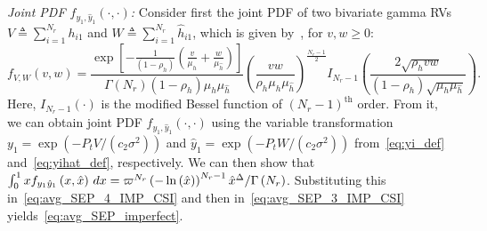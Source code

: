 \documentclass[12pt,draftcls,peerreview,onecolumn]{IEEEtran}
\newcommand{\define}{\triangleq}
\newcommand{\muh}{{\mu_{h}}}
\newcommand{\Nr}{{N_r}}
\newcommand{\Pt}{{P_t}}
\newcommand{\such}{h}
\newcommand{\hk}[1]{{\such_{#1}}}
\newcommand{\noisevar}{\sigma^2}
\newcommand{\ctwo}{c_{2}}
\newcommand{\yk}[1]{y_{#1}}
\newcommand{\snr}{\Omega}
\newcommand{\snrhat}{\widehat{\snr}}
\newcommand{\hhat}{\hat{\such}}
\newcommand{\hkhat}[1]{\hhat_{#1}}
\newcommand{\ykhat}[1]{\hat{y}_{#1}}
\newcommand{\muhhat}{\mu_{\hhat}}
\newcommand{\rhoh}{\rho_h}
\newcommand{\T}{\varpi}
\newcommand{\xhat}{\hat{x}}
\newcommand{\sumnr}{\sum_{i=1}^{\Nr}}
\begin{document}
{\em Joint PDF $f_{\yk{1},\ykhat{1}}\left(\cdot,\cdot\right)$:} Consider first the joint PDF of two bivariate gamma RVs $V\define\sumnr\hk{i1}$ and $W\define\sumnr\hkhat{i1}$, which is given by~\cite[(6.1)]{simon_alouini_book}, for $v,w\geq0$:
\begin{equation}
\label{eq:bivargammaPDF}
f_{V,W}(v,w) = \frac{\exp\left[{-\frac{1}{(1-\rhoh)}\left( \frac{v}{\muh}+\frac{w}{\muhhat}\right) } \right]}{\Gamma\left(\Nr \right) \left(1-\rhoh \right)\muh\muhhat }\left(\frac{vw}{\rhoh \muh\muhhat}\right)^{\frac{\Nr-1}{2}}  I_{\Nr-1}\left(\frac{2\sqrt{\rhoh vw}}{(1-\rhoh)\sqrt{\muh\muhhat}}\right).
\end{equation}
%  
Here, $I_{\Nr-1}\left(\cdot \right) $ is the modified Bessel function of $(\Nr-1)^{\text{th}}$ order. From it, we can obtain joint PDF $f_{\yk{1},\ykhat{1}}\left(\cdot,\cdot\right)$ using the variable transformation $\yk{1}=\exp\left(-\Pt V/(\ctwo\noisevar) \right) $ and $\ykhat{1}=\exp\left(-\Pt W/(\ctwo\noisevar) \right)$ from~\eqref{eq:yi_def} and~\eqref{eq:yihat_def}, respectively.  
%
% 
We can then show that $\int_{0}^{1} x f_{\yk{1}\ykhat{1}}\left(x,\xhat\right)\,dx = {\T^{\Nr}\left(-\ln\left({\xhat} \right)\right)^{\Nr-1}\xhat^{\D}}/{\Gamma\left(\Nr\right)}$.
Substituting this in~\eqref{eq:avg_SEP_4_IMP_CSI} and then in~\eqref{eq:avg_SEP_3_IMP_CSI}  yields~\eqref{eq:avg_SEP_imperfect}.
\end{document}
